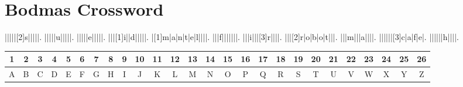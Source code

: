 \documentclass{exam}
\begin{document}
\section*{Bodmas Crossword}
\PuzzleSolution
\begin{Puzzle}{9}{11}
|{}|{}|{}|{}|[2]s|{}|{}|{}|{}|.
|{}|{}|{}|{}|u|{}|{}|{}|{}|.
|{}|{}|{}|{}|e|{}|{}|{}|{}|.
|{}|{}|[1]i|{}|d|{}|{}|{}|{}|.
|[1]m|a|n|t|e|l|{}|{}|{}|.
|{}|{}|f|{}|{}|{}|{}|{}|{}|.
|{}|{}|i|{}|{}|[3]r|{}|{}|{}|.
|{}|{}|[2]r|o|b|o|t|{}|{}|.
|{}|{}|m|{}|{}|a|{}|{}|{}|.
|{}|{}|{}|{}|{}|[3]c|a|f|e|.
|{}|{}|{}|{}|{}|h|{}|{}|{}|.
\end{Puzzle}
\begin{center}
{\footnotesize
\begin{tabular}{|c|c|c|c|c|c|c|c|c|c|c|c|c|c|c|c|c|c|c|c|c|c|c|c|c|c|}
\hline
1 & 2 & 3 & 4 & 5 & 6 & 7 & 8 & 9 & 10 & 11 & 12 & 13 & 14 & 15 & 16 & 17 & 18 & 19 & 20 & 21 & 22 & 23 & 24 & 25 & 26 \\
\hline
A & B & C & D & E & F & G & H & I & J & K & L & M & N & O & P & Q & R & S & T & U & V & W & X & Y & Z \\
\hline
\end{tabular}
}
\end{center}
\end{document}
